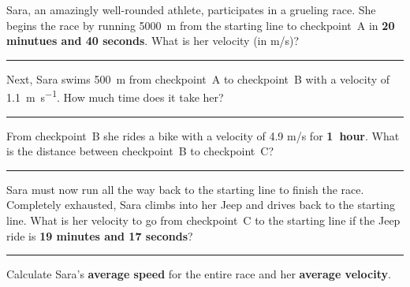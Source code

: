 \documentclass[12pt]{exam}
\begin{document}
\def\mystrut{\protect\rule[-2.2ex]{0ex}{2.2ex}} 
\qformat{ \textbf{Task \#\thequestion}
  \ifthenelse{\equal{\thequestion}{\thequestiontitle}}
    {}
    {: \emph{\thequestiontitle}}
  \mystrut  \hfill}
\begin{questions}

  \Large

  \question 
    Sara, an amazingly well-rounded athlete, participates in a grueling race.  She begins the race by running 5000~m from the starting line to checkpoint~A in {\bf 20 minutues and 40 seconds}.  What is her velocity (in m/s)?
    \vs\hrule\vs
  \question
    Next, Sara swims \SI{500}{\meter} from checkpoint~A to checkpoint~B with a velocity of \SI{1.1}{\meter\per\second}.  How much time does it take her?
    \vs\hrule\vs
  \question
    From checkpoint~B she rides a bike with a velocity of 4.9 m/s for {\bf 1~hour}.  What is the distance between checkpoint~B to checkpoint~C?
    \vs\hrule\vs
  \question
    Sara must now run all the way back to the starting line to finish the race.  Completely exhausted, Sara climbs into her Jeep and drives back to the starting line.  What is her velocity to go from checkpoint~C to the starting line if the Jeep ride is {\bf 19 minutes and 17 seconds}?
    \vs\hrule\vs
  \question
    Calculate Sara's {\bf average speed} for the entire race and her {\bf average velocity}.
 \end{questions}
\end{document}
